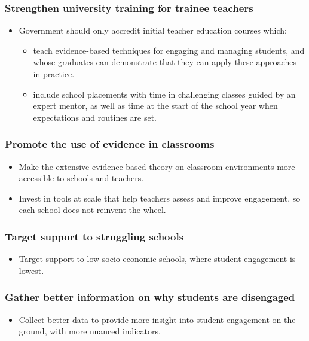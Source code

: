 \documentclass[FrontPage]{grattan}
\begin{document}
\begin{recommendations}
\vfill
\columnbreak  %

\label{rec:recommendation-2-system-level}
\subsubsection{Strengthen university training for trainee teachers}\label{subsubsec:ITEs-make-classroom-environment-priority}
\begin{itemize}
    \item Government should only accredit initial teacher education courses which:
    \begin{itemize}
        \item teach evidence-based techniques for engaging and managing students, and whose graduates can demonstrate that they can apply these approaches in practice.
        \item include school placements with time in challenging classes guided by an expert mentor, as well as time at the start of the school year when expectations and routines are set.
    \end{itemize}
\end{itemize}
\subsubsection{Promote the use of evidence in classrooms}\label{subsubsec:promote-use-evidence}
\begin{itemize}
    \item Make the extensive evidence-based theory on classroom environments more accessible to schools and teachers.
    \item Invest in tools at scale that help teachers assess and improve engagement, so each school does not reinvent the wheel.
\end{itemize}

\subsubsection{Target support to struggling schools}\label{subsubsec:target-support-struggling-schools}
\begin{itemize}
    \item Target support to low socio-economic schools, where student engagement is lowest.
\end{itemize}

\subsubsection{Gather better information on why students are disengaged }\label{subsubsec:gather-better-information}
\begin{itemize}
    \item Collect better data to provide more insight into student engagement on the ground, with more nuanced indicators.

\end{itemize}

\end{recommendations}
\end{document}
